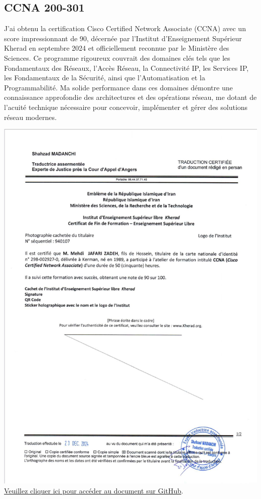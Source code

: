 \documentclass{article}
\begin{document}
    \newpage
    
    \subsection{CCNA 200-301}
    J'ai obtenu la certification Cisco Certified Network Associate (CCNA) avec un score impressionnant de 90, décernée par l'Institut d'Enseignement Supérieur Kherad en septembre 2024 et officiellement reconnue par le Ministère des Sciences. Ce programme rigoureux couvrait des domaines clés tels que les Fondamentaux des Réseaux, l'Accès Réseau, la Connectivité IP, les Services IP, les Fondamentaux de la Sécurité, ainsi que l'Automatisation et la Programmabilité. Ma solide performance dans ces domaines démontre une connaissance approfondie des architectures et des opérations réseau, me dotant de l'acuité technique nécessaire pour concevoir, implémenter et gérer des solutions réseau modernes.
     \newline
    \newline
        \begin{center}
            \includegraphics[width=\textwidth,height=\textheight,keepaspectratio]{../Document/Certificates of Achievement/CCNA 200-301/ccna.jpg}
            \footnotesize
             \href{https://github.com/jafarizadeh/CV---lettre/tree/903818f42bc563b419f3283c49cc84e05cf3932d/Document/Certificates%20of%20Achievement/CCNA%20200-301}{Veuillez cliquer ici pour accéder au document sur GitHub}.
        \end{center}
    \newpage
\end{document}
